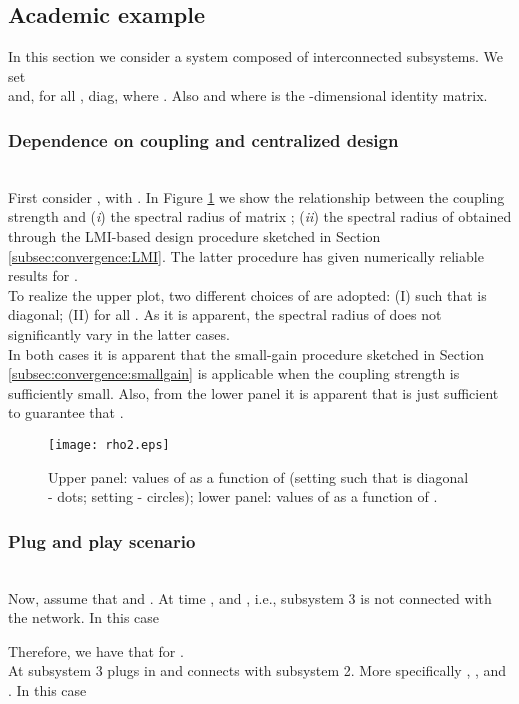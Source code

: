 \documentclass[journal,10pt,draftcls,onecolumn]{IEEEtran}
\begin{document}
\subsection{Academic example}
In this section we consider a system composed of interconnected subsystems. We set\\

and, for all , diag, where . Also  and  where  is the -dimensional identity matrix.
\subsubsection{Dependence on coupling and centralized design}\hfill\\
First consider , with .
In Figure \ref{fig:rho} we show the relationship between the coupling strength  and (\emph{i}) the spectral radius  of matrix ; (\emph{ii}) the spectral radius of  obtained through the LMI-based design procedure sketched in Section \ref{subsec:convergence:LMI}. The latter procedure has given numerically reliable results for .\\
To realize the upper plot, two different choices of  are adopted: (I) such that  is diagonal; (II)  for all . As it is apparent, the spectral radius of  does not significantly vary in the latter cases.\\
In both cases it is apparent that the small-gain procedure sketched in Section \ref{subsec:convergence:smallgain} is applicable when the coupling strength is sufficiently small. Also, from the lower panel it is apparent that  is just sufficient to guarantee that .
\begin{figure}
\centering
\texttt{[image: rho2.eps]}
\caption{Upper panel: values of  as a function of  (setting  such that  is diagonal - dots; setting  - circles); lower panel: values of  as a function of .}
\label{fig:rho}
\end{figure}

\subsubsection{Plug and play scenario}\hfill\\
Now, assume that  and . At time ,  and , i.e., subsystem 3 is not connected with the network. In this case

Therefore, we have that  for .\\
At  subsystem 3 plugs in and connects with subsystem 2. More specifically
, , and . In this case
\end{document}
